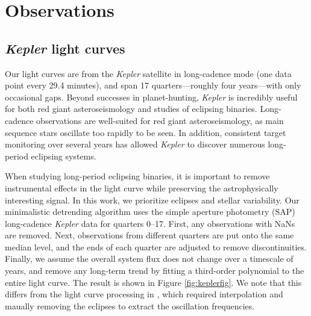 \section{Observations}\label{data}

\subsection{\emph{Kepler} light curves}\label{kepler}
Our light curves are from the \emph{Kepler} satellite in long-cadence mode (one data point every 29.4 minutes), and span 17 quarters---roughly four years---with only occasional gaps. Beyond successes in planet-hunting, \emph{Kepler} is incredibly useful for both red giant asteroseismology and studies of eclipsing binaries. Long-cadence observations are well-suited for red giant asteroseismology, as main sequence stars oscillate too rapidly to be seen. In addition, consistent target monitoring over several years has allowed \emph{Kepler} to discover numerous long-period eclipsing systems.

When studying long-period eclipsing binaries, it is important to remove instrumental effects in the light curve while preserving the astrophysically interesting signal. In this work, we prioritize eclipses and stellar variability. Our minimalistic detrending algorithm uses the simple aperture photometry (SAP) long-cadence \emph{Kepler} data for quarters 0--17. First, any observations with NaNs are removed. Next, observations from different quarters are put onto the same median level, and the ends of each quarter are adjusted to remove discontinuities. Finally, we assume the overall system flux does not change over a timescale of years, and remove any long-term trend by fitting a third-order polynomial to the entire light curve. The result is shown in Figure \ref{fig:keplerfig}. We note that this differs from the light curve processing in \citet{gau14}, which required interpolation and maually removing the eclipses to extract the oscillation frequencies.
